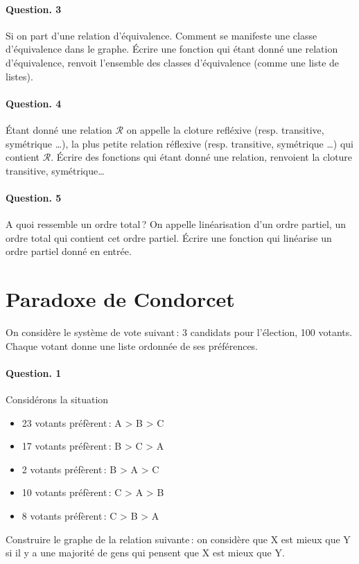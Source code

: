 \documentclass[10pt,a4paper]{article}
\begin{document}
\paragraph{Question. 3\\}
Si on part d'une relation d'équivalence. Comment se manifeste une classe
d'équivalence dans le graphe. Écrire une fonction qui étant donné une
relation d'équivalence, renvoit l'ensemble des classes d'équivalence
(comme une liste de listes).

\paragraph{Question. 4\\}
Étant donné une relation $\mathcal{R}$ on appelle la cloture refléxive (resp. transitive,
symétrique \dots), la plus petite relation réflexive (resp. transitive,
symétrique \dots) qui contient $\mathcal{R}$. Écrire des fonctions qui
étant donné une relation, renvoient la cloture transitive, symétrique\dots

\paragraph{Question. 5\\}
A quoi ressemble un ordre total\,? On appelle linéarisation d'un ordre
partiel, un ordre total qui contient cet ordre partiel. Écrire une
fonction qui linéarise un ordre partiel donné en entrée.
 
\section{Paradoxe de Condorcet}
On considère le système de vote suivant\,: 3 candidats pour l'élection,
100 votants. Chaque votant donne une liste ordonnée de ses préférences.
\paragraph{Question. 1\\}
Considérons la situation         
\begin{itemize}
\item 23 votants préfèrent\,: A > B > C
\item 17 votants préfèrent\,: B > C > A
\item 2 votants préfèrent\,: B > A > C
\item 10 votants préfèrent\,: C > A > B
\item 8 votants préfèrent\,: C > B > A
\end{itemize}
Construire le graphe de la relation suivante\,: on considère que X est
mieux que Y si il y a une majorité de gens qui pensent que X est mieux
que Y.
\end{document}
